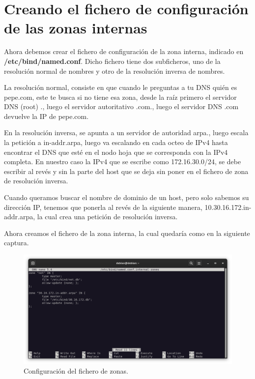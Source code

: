 \newpage
\section{Creando el fichero de configuración de las zonas internas}

Ahora debemos crear el fichero de configuración de la zona interna, indicado en \textbf{/etc/bind/named.conf}. Dicho fichero tiene dos subficheros, uno de la resolución normal de nombres y otro de la resolución inversa de nombres.

La resolución normal, consiste en que cuando le preguntas a tu DNS quién es pepe.com, este te busca si no tiene esa zona, desde la raíz primero el servidor DNS (root) ., luego el servidor autoritativo .com., luego el servidor DNS .com devuelve la IP de pepe.com.
\vspace{5mm}

En la resolución inversa, se apunta a un servidor de autoridad arpa., luego escala la petición a in-addr.arpa, luego va escalando en cada octeo de IPv4 hasta encontrar el DNS que esté en el nodo hoja que se corresponda con la IPv4 completa. En nuestro caso la IPv4 que se escribe como 172.16.30.0/24, se debe escribir al revés y sin la parte del host que se deja sin poner en el fichero de zona de resolución inversa. 

Cuando queramos buscar el nombre de dominio de un host, pero solo sabemos su dirección IP, tenemos que ponerla al revés de la siguiente manera, 10.30.16.172.in-addr.arpa, la cual crea una petición de resolución inversa.

Ahora creamos el fichero de la zona interna, la cual quedaría como en la siguiente captura. 

\begin{figure}[H]
	\centering
	\includegraphics[scale=0.30]{04}
	\caption{Configuración del fichero de zonas.}
\end{figure}

